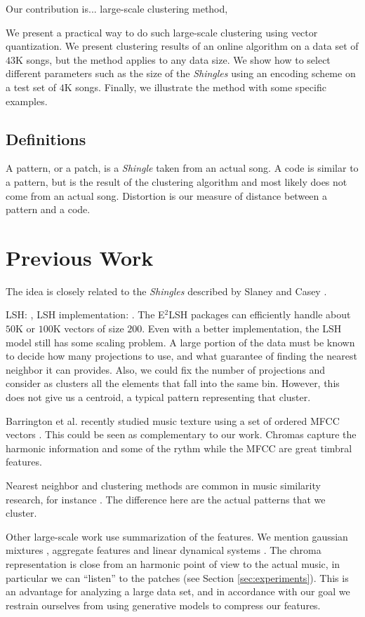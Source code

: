 \documentclass{article}
\begin{document}
Our contribution is... large-scale clustering method, 


We present a practical way to do such large-scale clustering using vector
quantization. We present clustering results of an online algorithm on a data 
set of $43$K songs, but the method applies to any data size. We show how to
select different parameters such as the size of the \textit{Shingles} 
using an encoding scheme on a test set of $4$K songs. Finally, we illustrate
the method with some specific examples.


\subsection{Definitions}
A pattern, or a patch, is a \textit{Shingle} taken from an actual song.
A code is similar to a pattern, but is the result of the clustering
algorithm and most likely does not come from an actual song.
Distortion is our measure of distance between a pattern and a code.


\section{Previous Work}\label{sec:prevwork}
The idea is closely related to the \textit{Shingles} described by
Slaney and Casey \cite{Casey2006,Casey2007,Casey2008}. 

LSH: \cite{Datar2004}, LSH implementation: \cite{E2LSH}.
The E$^2$LSH packages can efficiently handle about $50$K or $100$K
vectors of size $200$. Even with a better implementation, the LSH
model still has some scaling problem. A large portion of the data
must be known to decide how many projections to use, and what guarantee
of finding the nearest neighbor it can provides. Also, we could fix the
number of projections and consider as clusters all the elements that
fall into the same bin. However, this does not give us a centroid, a
typical pattern representing that cluster.

Barrington et al. recently studied music texture using a set of ordered
MFCC vectors \cite{Barrington2009a}. This could be seen as complementary
to our work. Chromas capture the harmonic information and some of the
rythm while the MFCC are great timbral features.

Nearest neighbor and clustering methods are common in music similarity 
research, for instance \cite{Cano2004,Holzapfel2009}. The difference here 
are the actual patterns that we cluster.

Other large-scale work use summarization of the features. We mention 
gaussian mixtures \cite{Mandel2005}, aggregate features \cite{Bergstra2006a}
and linear dynamical systems \cite{Barrington2009a}. The chroma representation
is close from an harmonic point of view to the actual music, in particular
we can ``listen'' to the patches (see Section \ref{sec:experiments}).
This is an advantage for analyzing a large data set, and in accordance with our goal
we restrain ourselves from using generative models to compress our features.
\end{document}
